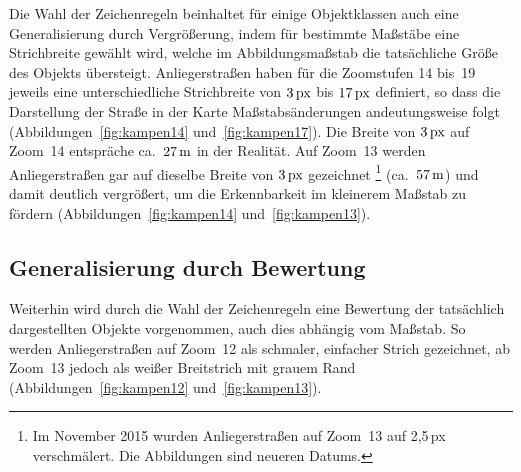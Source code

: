 \documentclass[../main/thesis.tex]{subfiles}
\begin{document}
Die Wahl der Zeichenregeln beinhaltet für einige Objektklassen auch eine Generalisierung durch Vergrößerung, indem für bestimmte Maßstäbe eine Strichbreite gewählt wird, welche im Abbildungsmaßstab die tatsächliche Größe des Objekts übersteigt.
Anliegerstraßen haben für die Zoomstufen 14 bis~19 jeweils eine unterschiedliche Strichbreite von $\unit[3]{px}$ bis $\unit[17]{px}$ definiert, so dass die Darstellung der Straße in der Karte Maßstabsänderungen andeutungsweise folgt (Abbildungen~\ref{fig:kampen14} und~\ref{fig:kampen17}). 
Die Breite von $\unit[3]{px}$ auf Zoom~14 entspräche ca.~$\unit[27]{m}$ in der Realität. 
Auf Zoom~13 werden Anliegerstraßen gar auf dieselbe Breite von $\unit[3]{px}$ gezeichnet%
\footnote{Im November 2015 wurden Anliegerstraßen auf Zoom~13 auf 2,5\,px verschmälert. Die Abbildungen sind neueren Datums.}
(ca.~$\unit[57]{m}$) und damit deutlich vergrößert, um die Erkennbarkeit im kleinerem Maßstab zu fördern (Abbildungen~\ref{fig:kampen14} und~\ref{fig:kampen13}).




\subsection{Generalisierung durch Bewertung}

Weiterhin wird durch die Wahl der Zeichenregeln eine Bewertung der tatsächlich dargestellten Objekte vorgenommen, auch dies abhängig vom Maßstab.
So werden Anliegerstraßen auf Zoom~12 als schmaler, einfacher Strich gezeichnet, ab Zoom~13 jedoch als weißer Breitstrich mit grauem Rand (Abbildungen~\ref{fig:kampen12} und~\ref{fig:kampen13}).


\end{document}
